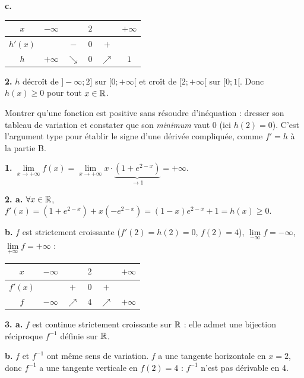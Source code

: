 \documentclass[11pt]{article}
\begin{document}
\textbf{c.}
\begin{center}\renewcommand{\arraystretch}{1.4}
\begin{tabular}{|c|ccccc|}
\hline $x$ & $-\infty$ & & $2$ & & $+\infty$ \\\hline $h'(x)$ & & $-$ & $0$ & $+$ & \\\hline $h$ & $+\infty$ & $\searrow$ & $0$ & $\nearrow$ & $1$ \\\hline
\end{tabular}
\end{center}

\textbf{2.} $h$ décroît de $]-\infty;2]$ sur $[0;+\infty[$ et croît de $[2;+\infty[$ sur $[0;1[$. Donc $h(x) \ge 0$ pour tout $x \in \mathbb{R}$.

\begin{methode}
Montrer qu'une fonction est positive sans résoudre d'inéquation :
dresser son tableau de variation et constater que son \emph{minimum}
vaut 0 (ici $h(2) = 0$). C'est l'argument type pour établir le signe
d'une dérivée compliquée, comme $f' = h$ à la partie B.
\end{methode}

\textbf{1.} $\lim\limits_{x\to+\infty} f(x) = \lim\limits_{x\to+\infty} x\cdot\underbrace{(1 + e^{2-x})}_{\to 1} = +\infty$.

\textbf{2. a.} $\forall x \in \mathbb{R}$, $f'(x) = (1 + e^{2-x}) + x(-e^{2-x}) = (1 - x)e^{2-x} + 1 = h(x) \ge 0$.

\textbf{b.} $f$ est strictement croissante ($f'(2) = h(2) = 0$, $f(2) = 4$), $\lim\limits_{-\infty} f = -\infty$, $\lim\limits_{+\infty} f = +\infty$ :
\begin{center}\renewcommand{\arraystretch}{1.4}
\begin{tabular}{|c|ccccc|}
\hline $x$ & $-\infty$ & & $2$ & & $+\infty$ \\\hline $f'(x)$ & & $+$ & $0$ & $+$ & \\\hline $f$ & $-\infty$ & $\nearrow$ & $4$ & $\nearrow$ & $+\infty$ \\\hline
\end{tabular}
\end{center}

\textbf{3. a.} $f$ est continue strictement croissante sur $\mathbb{R}$ : elle admet une bijection réciproque $f^{-1}$ définie sur $\mathbb{R}$.

\textbf{b.} $f$ et $f^{-1}$ ont même sens de variation. $f$ a une tangente horizontale en $x = 2$, donc $f^{-1}$ a une tangente verticale en $f(2) = 4$ : $f^{-1}$ n'est pas dérivable en 4.
\end{document}
